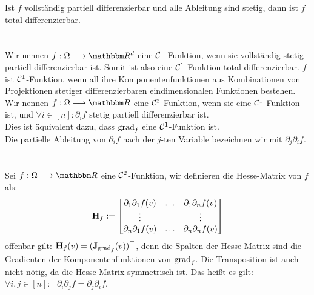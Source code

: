 Ist \(f\) vollständig partiell differenzierbar und alle Ableitung sind stetig, dann ist \(f\) total differenzierbar. \\ \\
 \\
Wir nennen \(f: \Omega \longrightarrow \R^d\) eine \(\mathcal C^1\)-Funktion, wenn sie vollständig stetig partiell differenzierbar ist. Somit ist also eine \(\mathcal C^1\)-Funktion total differenzierbar.
\(f\) ist \(\mathcal C^1\)-Funktion, wenn all ihre Komponentenfunktionen aus Kombinationen von Projektionen stetiger differenzierbaren eindimensionalen Funktionen bestehen. \\
Wir nennen \(f: \Omega \longrightarrow \R\) eine \(\mathcal C^2\)-Funktion, wenn sie eine \(\mathcal C^1\)-Funktion ist, und \(\forall i \in [n]: \partial_if\) stetig partiell differenzierbar ist. \\
Dies ist äquivalent dazu, dass \(\text{grad}_f\) eine \(\mathcal C^1\)-Funktion ist. \\Die partielle
Ableitung von \(\partial_i f\) nach der \(j\)-ten Variable bezeichnen wir mit \(\partial_j\partial_if\). \\ \\
 \\
Sei \(f: \Omega \longrightarrow \R\) eine \(\mathcal C^2\)-Funktion, wir definieren die Hesse-Matrix von \(f\) als: \[\textbf{H}_f := \begin{bmatrix}
    \partial_1\partial_1f(v) & \hdots & \partial_1\partial_nf(v) \\
    \vdots & & \vdots \\
    \partial_n\partial_1f(v) & \hdots & \partial_n\partial_nf(v)
\end{bmatrix}\] offenbar gilt: \(\textbf{H}_f(v) = (\textbf{J}_{\text{grad}_f}(v))^{\top}\), denn die Spalten der Hesse-Matrix sind die
Gradienten der Komponentenfunktionen von \(\text{grad}_f\).
Die Transposition ist auch nicht nötig, da die Hesse-Matrix symmetrisch ist. Das heißt es gilt: \(\forall i,j\in[n]{:}\text{ } \partial_i\partial_jf = \partial_j\partial_if\).
